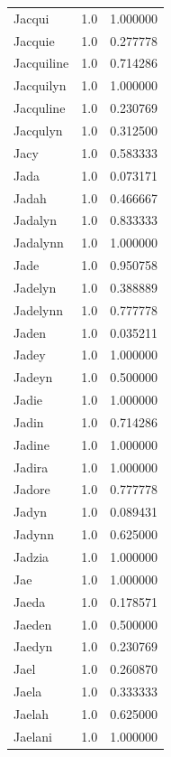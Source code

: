\documentclass[
  letterpaper,
  DIV=11,
  numbers=noendperiod]{scrreprt}
\begin{document}
\begin{tabular}{lrr}
Jacqui          &   1.0 &   1.000000 \\
Jacquie         &   1.0 &   0.277778 \\
Jacquiline      &   1.0 &   0.714286 \\
Jacquilyn       &   1.0 &   1.000000 \\
Jacquline       &   1.0 &   0.230769 \\
Jacqulyn        &   1.0 &   0.312500 \\
Jacy            &   1.0 &   0.583333 \\
Jada            &   1.0 &   0.073171 \\
Jadah           &   1.0 &   0.466667 \\
Jadalyn         &   1.0 &   0.833333 \\
Jadalynn        &   1.0 &   1.000000 \\
Jade            &   1.0 &   0.950758 \\
Jadelyn         &   1.0 &   0.388889 \\
Jadelynn        &   1.0 &   0.777778 \\
Jaden           &   1.0 &   0.035211 \\
Jadey           &   1.0 &   1.000000 \\
Jadeyn          &   1.0 &   0.500000 \\
Jadie           &   1.0 &   1.000000 \\
Jadin           &   1.0 &   0.714286 \\
Jadine          &   1.0 &   1.000000 \\
Jadira          &   1.0 &   1.000000 \\
Jadore          &   1.0 &   0.777778 \\
Jadyn           &   1.0 &   0.089431 \\
Jadynn          &   1.0 &   0.625000 \\
Jadzia          &   1.0 &   1.000000 \\
Jae             &   1.0 &   1.000000 \\
Jaeda           &   1.0 &   0.178571 \\
Jaeden          &   1.0 &   0.500000 \\
Jaedyn          &   1.0 &   0.230769 \\
Jael            &   1.0 &   0.260870 \\
Jaela           &   1.0 &   0.333333 \\
Jaelah          &   1.0 &   0.625000 \\
Jaelani         &   1.0 &   1.000000 \\

\end{tabular}
\end{document}
